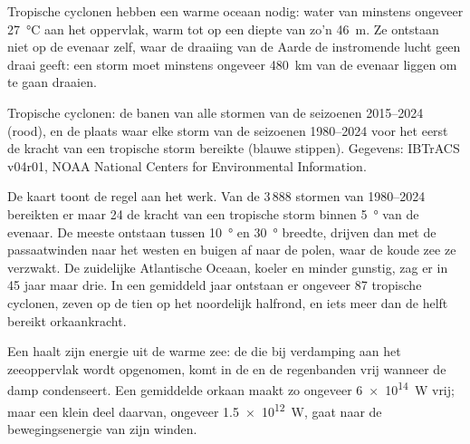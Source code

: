 Tropische cyclonen hebben een warme oceaan nodig: water van minstens ongeveer
\qty{27}{\degreeCelsius} aan het oppervlak, warm tot op een diepte van zo'n
\qty{46}{m}. Ze ontstaan niet op de evenaar zelf, waar de draaiing van de Aarde
de instromende lucht geen draai geeft: een storm moet minstens ongeveer
\qty{480}{km} van de evenaar liggen om te gaan draaien.

\begin{omfigure}

{\small Tropische cyclonen: de banen van alle stormen van de seizoenen
2015--2024 (rood), en de plaats waar elke storm van de seizoenen 1980--2024 voor
het eerst de kracht van een tropische storm bereikte (blauwe stippen).
Gegevens: IBTrACS v04r01, NOAA National Centers for Environmental Information.}
\end{omfigure}

De kaart toont de regel aan het werk. Van de 3\,888 stormen van 1980--2024
bereikten er maar 24 de kracht van een tropische storm binnen \qty{5}{\degree}
van de evenaar. De meeste ontstaan tussen \qty{10}{\degree} en \qty{30}{\degree}
breedte, drijven dan met de passaatwinden naar het westen en buigen af naar de
polen, waar de koude zee ze verzwakt. De zuidelijke Atlantische Oceaan, koeler
en minder gunstig, zag er in 45 jaar maar drie. In een gemiddeld jaar ontstaan
er ongeveer 87 tropische cyclonen, zeven op de tien op het noordelijk halfrond,
en iets meer dan de helft bereikt orkaankracht.

\begin{proposition}\label{prop:g10:storms-and-cyclones:energy}
Een  haalt zijn energie uit de warme zee: de  die
bij verdamping aan het zeeoppervlak wordt opgenomen, komt in de  en de
regenbanden vrij wanneer de damp condenseert. Een gemiddelde orkaan maakt zo
ongeveer \qty{6e14}{W} vrij; maar een klein deel daarvan, ongeveer
\qty{1.5e12}{W}, gaat naar de bewegingsenergie van zijn winden.
\end{proposition}

